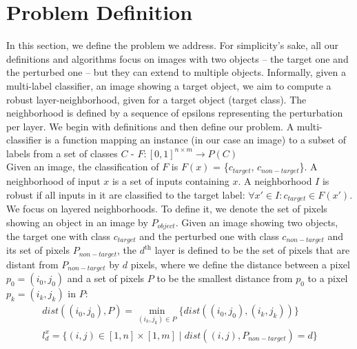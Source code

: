 

\section{Problem Definition}
In this section, we define the problem we address.
For simplicity's sake, all our definitions and algorithms focus on images with two objects -- the target one and the perturbed one -- but they can extend to multiple objects.
Informally, given a multi-label classifier, an image showing a target object, we aim to compute a robust layer-neighborhood, given for a target object (target class).
The neighborhood is defined by a sequence of epsilons representing the perturbation per layer.
We begin with definitions and then define our problem.
A multi-classifier is a function mapping an instance (in our case an image) to a subset of labels from a set of classes $C$ -
$F:[0, 1]^{n \times m} \rightarrow P(C)$\\
Given an image, the classification of $F$ is $F(x)$ = \{$c_{target}$, $c_{non-target}$\}.
A neighborhood of input $x$ is a set of inputs containing $x$.
A neighborhood $I$ is robust if all inputs in it are classified to the target label: $\forall x' \in I: c_{target} \in F(x').$\\
We focus on layered neighborhoods.
To define it, we denote the set of pixels showing an object in an image by $P_{object}$.
Given an image showing two objects, the target one with class $c_{target}$ and the perturbed one with class $c_{non-target}$ and its set of pixels $P_{non-target}$, the $d^\text{th}$ layer is defined to be the set of pixels that are distant from $P_{non-target}$ by $d$ pixels, where we define the distance between a pixel $p_0 = (i_0, j_0)$ and a set of pixels $P$ to be the smallest distance from $p_0$ to a pixel $p_k = (i_k, j_k)$ in $P$:
\begin{gather*}
    dist((i_0,j_0), P) = \min_{(i_k, j_k) \in P}\{dist((i_0, j_0), (i_k, j_k))\}\\
    l_d^x = \{(i,j) \in [1,n]\times [1,m] \mid dist((i, j), P_{non-target}) = d\}\\
\end{gather*}
